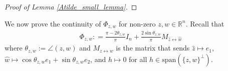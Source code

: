 \documentclass[11pt]{article}
\renewcommand{\epsilon}{\varepsilon}
\newcommand{\R}{\mathbb{R}}
\theoremstyle{remark}
\begin{document}
\begin{proof}[Proof of Lemma \ref{Atilde_small_lemma}]

\end{proof}

We now prove the continuity of $\Phi_{z,w}$ for non-zero $z,w \in \R^n$. Recall that \begin{align*}
    \Phi_{z,w} : = \frac{\pi - 2\theta_{z,w}}{\pi} I_{n} + \frac{2\sin \theta_{z,w}}{\pi}M_{\hat{z} \leftrightarrow \hat{w}}
\end{align*} where $\theta_{z,w} := \angle(z,w)$ and $M_{z \leftrightarrow w}$ is the matrix that sends $\hat{z} \mapsto e_1$, $\hat{w} \mapsto \cos \theta_{z,w} e_1 + \sin \theta_{z,w} e_2$, and $h \mapsto 0$ for all $h \in \text{span}(\{z,w\}^{\perp}).$
\end{document}
